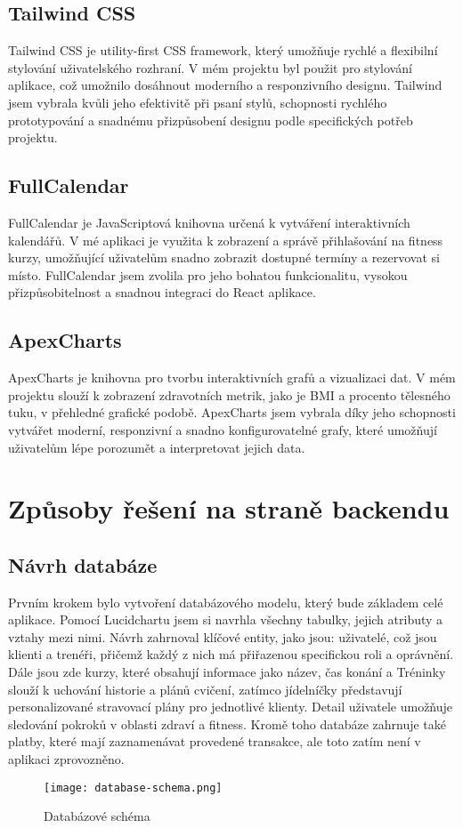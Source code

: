 \documentclass[12pt, a4paper,
twoside,        %
openany
]{report}
\begin{document}
\section{Tailwind CSS}
Tailwind CSS je utility-first CSS framework, který umožňuje rychlé a flexibilní stylování uživatelského rozhraní. V mém projektu byl použit pro stylování aplikace, což umožnilo dosáhnout moderního a responzivního designu. Tailwind jsem vybrala kvůli jeho efektivitě při psaní stylů, schopnosti rychlého prototypování a snadnému přizpůsobení designu podle specifických potřeb projektu. 

\section{FullCalendar}
FullCalendar je JavaScriptová knihovna určená k vytváření interaktivních kalendářů. V mé aplikaci je využita k zobrazení a správě přihlašování na fitness kurzy, umožňující uživatelům snadno zobrazit dostupné termíny a rezervovat si místo. FullCalendar jsem zvolila pro jeho bohatou funkcionalitu, vysokou přizpůsobitelnost a snadnou integraci do React aplikace.

\section{ApexCharts}
ApexCharts je knihovna pro tvorbu interaktivních grafů a vizualizaci dat. V mém projektu slouží k zobrazení zdravotních metrik, jako je BMI a procento tělesného tuku, v přehledné grafické podobě. ApexCharts jsem vybrala díky jeho schopnosti vytvářet moderní, responzivní a snadno konfigurovatelné grafy, které umožňují uživatelům lépe porozumět a interpretovat jejich data. 
        
\chapter{Způsoby řešení na straně backendu}
\section{Návrh databáze}
Prvním krokem bylo vytvoření databázového modelu, který bude základem celé aplikace. Pomocí Lucidchartu jsem si navrhla všechny tabulky, jejich atributy a vztahy mezi nimi. Návrh zahrnoval klíčové entity, jako jsou: uživatelé, což jsou klienti a trenéři, přičemž každý z nich má přiřazenou specifickou roli a oprávnění. Dále jsou zde kurzy, které obsahují informace jako název, čas konání a Tréninky slouží k uchování historie a plánů cvičení, zatímco jídelníčky představují personalizované stravovací plány pro jednotlivé klienty. Detail uživatele umožňuje sledování pokroků v oblasti zdraví a fitness. Kromě toho databáze zahrnuje také platby, které mají zaznamenávat provedené transakce, ale toto zatím není v aplikaci zprovozněno.
\begin{figure}[h]
    \centering
    \texttt{[image: database-schema.png]} 
    \caption{Databázové schéma}
    
\end{figure}
\vspace{18pt}
\clearpage
\end{document}
